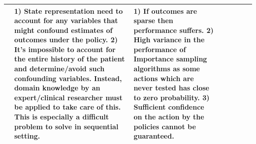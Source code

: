 \begin{table}[!th]
\begin{tabular}{|p{3 em}|p{3 em}|p{3 em}|p{3em}|p{6em}|p{8em}|p{7 em}|p{6em}|}
& 
\textbf{1)}  State representation need to account for any variables that might confound estimates of outcomes under the policy. \textbf{2)} It's impossible to account for the entire history of the patient and determine/avoid such confounding variables.  Instead, domain knowledge by an expert/clinical researcher must be applied to take care of this. This is especially a difficult problem to solve in sequential setting.
& 
\textbf{1)} If outcomes are sparse then performance suffers. \textbf{2)} High variance in the performance of Importance sampling algorithms as some actions which are never tested has close to zero probability. \textbf{3)} Sufficient confidence on the action by the policies cannot be guaranteed.
   \\\midrule
\end{tabular}
\vspace*{-2em}
\end{table}   



